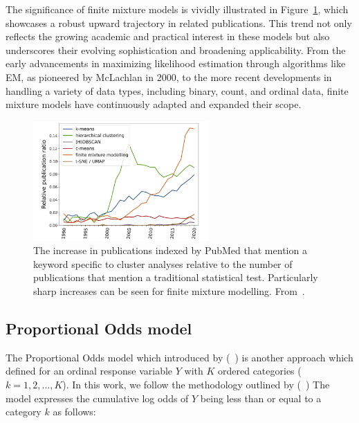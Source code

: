 \documentclass{article}
\begin{document}
The significance of finite mixture models is vividly illustrated in Figure~\ref{fig:trend}, which showcases a robust upward trajectory in related publications. This trend not only reflects the growing academic and practical interest in these models but also underscores their evolving sophistication and broadening applicability. From the early advancements in maximizing likelihood estimation through algorithms like EM, as pioneered by McLachlan in 2000, to the more recent developments in handling a variety of data types, including binary, count, and ordinal data, finite mixture models have continuously adapted and expanded their scope.

\begin{figure}[ht!] %
    \centering %
    \includegraphics[width=0.6\textwidth]{images/trend.png} %
    \caption{The increase in publications indexed by PubMed that mention a keyword specific to cluster analyses relative to the number of publications 
    that mention a traditional statistical test. 
    Particularly sharp increases can be seen for finite mixture modelling.
    From~\cite{dalmaijer2022statistical}.} %
    \label{fig:trend} %
  \end{figure}

\subsection{Proportional Odds model}

The Proportional Odds model which introduced by (~\cite{mccullagh1980regression}) is another approach which defined for an ordinal response variable $Y$ with $K$ ordered categories ($k=1, 2, \ldots, K$). 
In this work, we follow the methodology outlined by (~\cite{matechou2016biclustering})
The model expresses the cumulative log odds of $Y$ being less than or equal to a category $k$ as follows:
\end{document}

